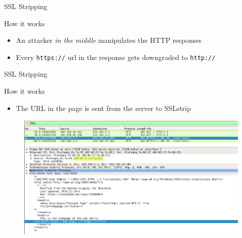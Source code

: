 \documentclass{beamer}
\begin{document}
\begin{frame}{SSL Stripping}
  \begin{block}{How it works}
    \begin{itemize}
      \item An attacker \textit{in the middle} manipulates the HTTP responses
      \item Every \texttt{https://} url in the response gets downgraded to \texttt{http://}
    \end{itemize}
  \end{block}
\end{frame}

\begin{frame}{SSL Stripping}
  \begin{block}{How it works}
    \begin{itemize}
      \item The URL in the page is sent from the server to SSLstrip
    \end{itemize}
  \end{block}
  \begin{figure}
    \includegraphics[width=\textwidth]{../figures/sslstrip_https}
    \caption*{}
  \end{figure}
\end{frame}
\end{document}
